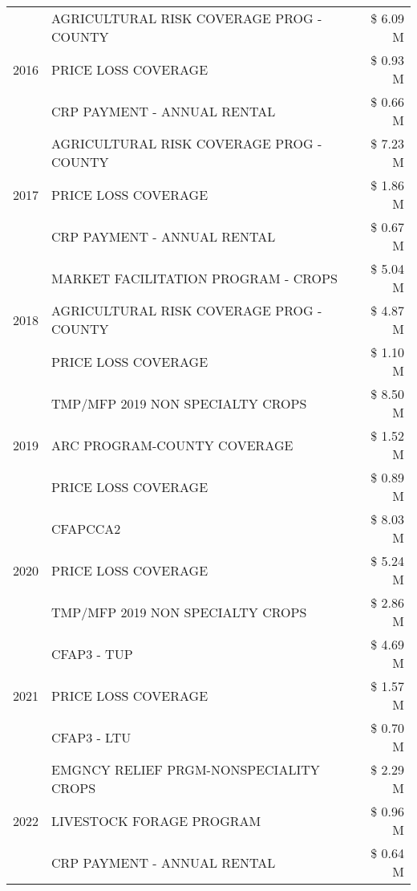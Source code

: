 \begin{tabular}{llr}
\cline{1-3}
\multirow[t]{3}{*}{2016} & AGRICULTURAL RISK COVERAGE PROG - COUNTY & \$ 6.09 M \\
 & PRICE LOSS COVERAGE & \$ 0.93 M \\
 & CRP PAYMENT - ANNUAL RENTAL & \$ 0.66 M \\
\cline{1-3}
\multirow[t]{3}{*}{2017} & AGRICULTURAL RISK COVERAGE PROG - COUNTY & \$ 7.23 M \\
 & PRICE LOSS COVERAGE & \$ 1.86 M \\
 & CRP PAYMENT - ANNUAL RENTAL & \$ 0.67 M \\
\cline{1-3}
\multirow[t]{3}{*}{2018} & MARKET FACILITATION PROGRAM - CROPS & \$ 5.04 M \\
 & AGRICULTURAL RISK COVERAGE PROG - COUNTY & \$ 4.87 M \\
 & PRICE LOSS COVERAGE & \$ 1.10 M \\
\cline{1-3}
\multirow[t]{3}{*}{2019} & TMP/MFP 2019 NON SPECIALTY CROPS & \$ 8.50 M \\
 & ARC PROGRAM-COUNTY COVERAGE & \$ 1.52 M \\
 & PRICE LOSS COVERAGE & \$ 0.89 M \\
\cline{1-3}
\multirow[t]{3}{*}{2020} & CFAPCCA2 & \$ 8.03 M \\
 & PRICE LOSS COVERAGE & \$ 5.24 M \\
 & TMP/MFP 2019 NON SPECIALTY CROPS & \$ 2.86 M \\
\cline{1-3}
\multirow[t]{3}{*}{2021} & CFAP3 - TUP & \$ 4.69 M \\
 & PRICE LOSS COVERAGE & \$ 1.57 M \\
 & CFAP3 - LTU & \$ 0.70 M \\
\cline{1-3}
\multirow[t]{3}{*}{2022} & EMGNCY RELIEF PRGM-NONSPECIALITY CROPS & \$ 2.29 M \\
 & LIVESTOCK FORAGE PROGRAM & \$ 0.96 M \\
 & CRP PAYMENT - ANNUAL RENTAL & \$ 0.64 M \\
\cline{1-3}
\bottomrule
\end{tabular}
